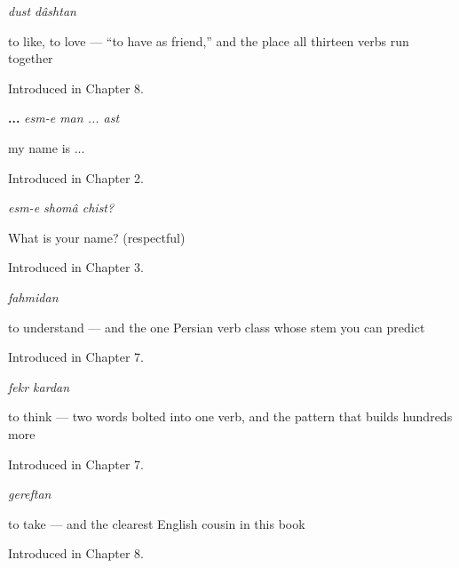 \noindent\begin{minipage}[t]{\linewidth}
\raggedright
\textbf{ }\enspace\emph{dust dâshtan}\par
\small to like, to love — “to have as friend,” and the place all thirteen verbs run together\par
\footnotesize Introduced in Chapter 8.
\end{minipage}\par\medskip

\noindent\begin{minipage}[t]{\linewidth}
\raggedright
\textbf{  ... }\enspace\emph{esm-e man ... ast}\par
\small my name is ...\par
\footnotesize Introduced in Chapter 2.
\end{minipage}\par\medskip

\noindent\begin{minipage}[t]{\linewidth}
\raggedright
\textbf{  }\enspace\emph{esm-e shomâ chist?}\par
\small What is your name? (respectful)\par
\footnotesize Introduced in Chapter 3.
\end{minipage}\par\medskip

\noindent\begin{minipage}[t]{\linewidth}
\raggedright
\textbf{}\enspace\emph{fahmidan}\par
\small to understand — and the one Persian verb class whose stem you can predict\par
\footnotesize Introduced in Chapter 7.
\end{minipage}\par\medskip

\noindent\begin{minipage}[t]{\linewidth}
\raggedright
\textbf{ }\enspace\emph{fekr kardan}\par
\small to think — two words bolted into one verb, and the pattern that builds hundreds more\par
\footnotesize Introduced in Chapter 7.
\end{minipage}\par\medskip

\noindent\begin{minipage}[t]{\linewidth}
\raggedright
\textbf{}\enspace\emph{gereftan}\par
\small to take — and the clearest English cousin in this book\par
\footnotesize Introduced in Chapter 8.
\end{minipage}\par\medskip

